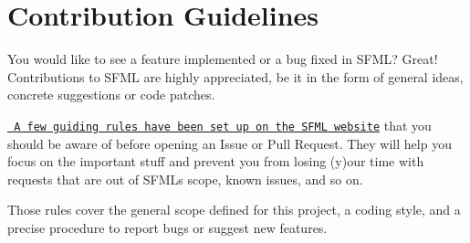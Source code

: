 \chapter{Contribution Guidelines}
\hypertarget{md_cmake-build-debug_2__deps_2sfml-src_2_c_o_n_t_r_i_b_u_t_i_n_g}{}\label{md_cmake-build-debug_2__deps_2sfml-src_2_c_o_n_t_r_i_b_u_t_i_n_g}
\label{md_cmake-build-debug_2__deps_2sfml-src_2_c_o_n_t_r_i_b_u_t_i_n_g_autotoc_md67}%
%
 You would like to see a feature implemented or a bug fixed in SFML? Great! Contributions to SFML are highly appreciated, be it in the form of general ideas, concrete suggestions or code patches.

\href{https://www.sfml-dev.org/contribute.php}{\texttt{ A few guiding rules have been set up on the SFML website}} that you should be aware of before opening an Issue or Pull Request. They will help you focus on the important stuff and prevent you from losing (y)our time with requests that are out of SFML\textquotesingle{}s scope, known issues, and so on.

Those rules cover the general scope defined for this project, a coding style, and a precise procedure to report bugs or suggest new features. 